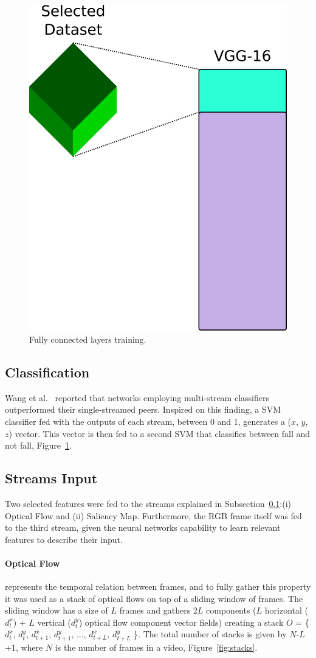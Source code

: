\documentclass[conference]{IEEEtran}
\begin{document}
\begin{figure}[htbp]
\centerline{\includegraphics[width=0.4\linewidth]{figures/pos14.png}}
\caption{Fully connected layers training.}
\label{fig:pos14}
\end{figure}

\subsection{Classification}
\label{sec:classification}

Wang et al.~\cite{wang2015towards} reported that networks employing multi-stream classifiers outperformed their single-streamed peers. Inspired on this finding, a SVM classifier fed with the outputs of each stream, between 0 and 1, generates a ($x$, $y$, $z$) vector. This vector is then fed to a second SVM that classifies between fall and not fall, Figure~\ref{fig:pos14}.

\subsection{Streams Input}

Two selected features were fed to the streams explained in Subsection~\ref{sec:classification}:(i) Optical Flow and (ii) Saliency Map. Furthermore, the RGB frame itself was fed to the third stream, given the neural networks capability to learn relevant features to describe their input.

\paragraph{Optical Flow} represents the temporal relation between frames, and to fully gather this property it was used as a stack of optical flows on top of a sliding window of frames. The sliding window has a size of $L$ frames and gathers 2$L$ components ($L$ horizontal ($d_t^x$) + $L$ vertical ($d_t^y$) optical flow component vector fields) creating a stack $O$ = \{$d_t^x$, $d_t^y$, $d_{t+1}^x$, $d_{t+1}^y$, ..., $d_{t+L}^x$, $d_{t+L}^y$ \}. The total number of stacks is given by $N$-$L$+$1$, where $N$ is the number of frames in a video, Figure~\ref{fig:stacks}. 
\end{document}
